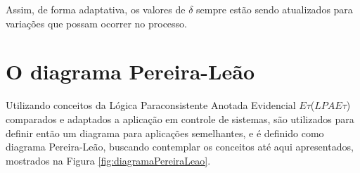 
Assim, de forma adaptativa, 
os valores de $\delta$ sempre estão sendo atualizados
para variações que possam ocorrer no processo. 


\newpage


\section{O diagrama Pereira-Leão}

Utilizando conceitos da Lógica Paraconsistente Anotada Evidencial $E\tau$($LPAE\tau$)
comparados e adaptados a aplicação em controle de sistemas,
são utilizados para definir então um diagrama para aplicações semelhantes,
e é definido como diagrama Pereira-Leão,
buscando contemplar os conceitos até aqui apresentados,
mostrados na Figura \ref{fig:diagramaPereiraLeao}.

